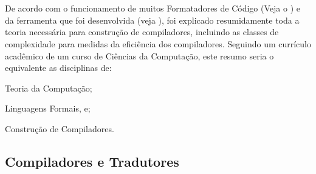 

\chapter{}
\label{fundamentacaoTeorica}

De acordo com o funcionamento de muitos Formatadores de Código (Veja o ) e
da ferramenta que foi desenvolvida (veja ),
foi explicado resumidamente toda a teoria necessária para construção de compiladores,
incluindo as classes de complexidade para medidas da eficiência dos compiladores.
Seguindo um currículo acadêmico de um curso de Ciências da Computação,
este resumo seria o equivalente as disciplinas de:
\begin{inparaenum}[1)]
\item Teoria da Computação;
\item Linguagens Formais, e;
\item Construção de Compiladores.
\end{inparaenum}%


\section{Compiladores e Tradutores}
\label{compiladoresEtradutores}

